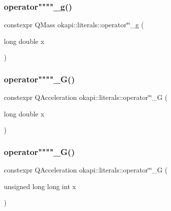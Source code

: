 \mbox{\label{namespaceokapi_1_1literals_a804d615fdde9f059303992644b09e6f1}} 
\subsubsection{\texorpdfstring{operator""""\_g()}{operator""\_g()}\hspace{0.1cm}{\footnotesize\ttfamily [1/2]}}
{\footnotesize\ttfamily constexpr Q\+Mass okapi\+::literals\+::operator\char`\"{}\char`\"{}\+\_\+g (\begin{DoxyParamCaption}\item[{long double}]{x }\end{DoxyParamCaption})}

\mbox{\label{namespaceokapi_1_1literals_a5cc15340933c02ba4a590ac7cc8f2aec}} 
\subsubsection{\texorpdfstring{operator""""\_G()}{operator""\_G()}\hspace{0.1cm}{\footnotesize\ttfamily [1/2]}}
{\footnotesize\ttfamily constexpr Q\+Acceleration okapi\+::literals\+::operator\char`\"{}\char`\"{}\+\_\+G (\begin{DoxyParamCaption}\item[{long double}]{x }\end{DoxyParamCaption})}

\mbox{\label{namespaceokapi_1_1literals_a41dfbc6575374e3b284f77002233f3c3}} 
\subsubsection{\texorpdfstring{operator""""\_G()}{operator""\_G()}\hspace{0.1cm}{\footnotesize\ttfamily [2/2]}}
{\footnotesize\ttfamily constexpr Q\+Acceleration okapi\+::literals\+::operator\char`\"{}\char`\"{}\+\_\+G (\begin{DoxyParamCaption}\item[{unsigned long long int}]{x }\end{DoxyParamCaption})}

